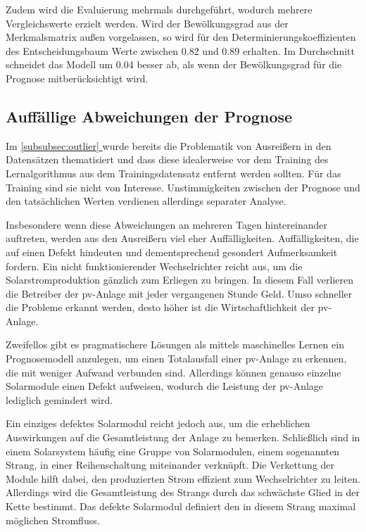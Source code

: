 \documentclass[12pt, a4paper]{article}
\newcommand*{\fullref}[1]{\hyperref[{#1}]{\autoref*{#1} \textit{\nameref*{#1}}}}
\begin{document}
Zudem wird die Evaluierung mehrmals durchgeführt, wodurch mehrere Vergleichswerte erzielt werden. Wird der Bewölkungsgrad aus der Merkmalsmatrix außen vorgelassen, so wird für den Determinierungskoeffizienten des Entscheidungsbaum Werte zwischen 0.82 und 0.89 erhalten. Im Durchschnitt schneidet das Modell um 0.04 besser ab, als wenn der Bewölkungsgrad für die Prognose mitberücksichtigt wird. 

\subsection{Auffällige Abweichungen der Prognose}

Im \fullref{subsubsec:outlier} wurde bereits die Problematik von Ausreißern in den Datensätzen thematisiert und dass diese idealerweise vor dem Training des Lernalgorithmus aus dem Trainingsdatensatz entfernt werden sollten. Für das Training sind sie nicht von Interesse. Unstimmigkeiten zwischen der Prognose und den tatsächlichen Werten verdienen allerdings separater Analyse.

Insbesondere wenn diese Abweichungen an mehreren Tagen hintereinander auftreten, werden aus den Ausreißern viel eher Auffälligkeiten. Auffälligkeiten, die auf einen Defekt hindeuten und dementsprechend gesondert Aufmerksamkeit fordern. Ein nicht funktionierender Wechselrichter reicht aus, um die Solarstromproduktion gänzlich zum Erliegen zu bringen. In diesem Fall verlieren die Betreiber der \ac{pv}-Anlage mit jeder vergangenen Stunde Geld. Umso schneller die Probleme erkannt werden, desto höher ist die Wirtschaftlichkeit der \ac{pv}-Anlage.

Zweifellos gibt es pragmatischere Lösungen als mittels maschinelles Lernen ein Prognosemodell anzulegen, um einen Totalausfall einer \ac{pv}-Anlage zu erkennen, die mit weniger Aufwand verbunden sind. Allerdings können genauso einzelne Solarmodule einen Defekt aufweisen, wodurch die Leistung der \ac{pv}-Anlage lediglich gemindert wird. 

Ein einziges defektes Solarmodul reicht jedoch aus, um die erheblichen Auswirkungen auf die Gesamtleistung der Anlage zu bemerken. Schließlich sind in einem Solarsystem häufig eine Gruppe von Solarmodulen, einem sogenannten Strang, in einer Reihenschaltung miteinander verknüpft. Die Verkettung der Module hilft dabei, den produzierten Strom effizient zum Wechselrichter zu leiten. Allerdings wird die Gesamtleistung des Strangs durch das schwächste Glied in der Kette bestimmt. Das defekte Solarmodul definiert den in diesem Strang maximal möglichen Stromfluss.
\end{document}
